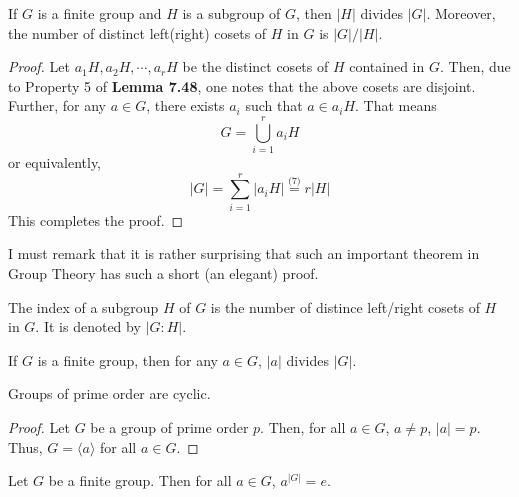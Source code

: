 \begin{theorem}\label{thm:lagrange}
	If $G$ is a finite group and $H$ is a subgroup of $G$, then $|H|$ divides $|G|$. Moreover, the number of distinct left(right) cosets of $H$ in $G$ is $|G|/|H|$.
\end{theorem}
\begin{proof}
	Let $a_1H,a_2H,\cdots,a_rH$ be the distinct cosets of $H$ contained in $G$. Then, due to Property 5 of \textbf{Lemma 7.48}, one notes that the above cosets are disjoint. Further, for any $a\in G$, there exists $a_i$ such that $a\in a_iH$. That means 
	$$
	G=\bigcup_{i=1}^{r}a_iH
	$$
	or equivalently,
	$$
	|G| = \sum_{i=1}^{r}|a_iH|\stackrel{\text{(7)}}{=} r|H|
	$$
	This completes the proof.
\end{proof}
I must remark that it is rather surprising that such an important theorem in Group Theory has such a short (an elegant) proof.
\begin{definition}
	The index of a subgroup $H$ of $G$ is the number of distince left/right cosets of $H$ in $G$. It is denoted by $|G:H|$.
\end{definition}
\begin{corollary}
	If $G$ is a finite group, then for any $a\in G$, $|a|$ divides $|G|$.
\end{corollary}
\begin{corollary}
	Groups of prime order are cyclic.
\end{corollary}
\begin{proof}
	Let $G$ be a group of prime order $p$. Then, for all $a\in G$, $a\ne p$, $|a|=p$. Thus, $G=\langle a\rangle$ for all $a\in G$.
\end{proof}
\begin{corollary}
	Let $G$ be a finite group. Then for all $a\in G$, $a^{|G|}=e$.
\end{corollary}

